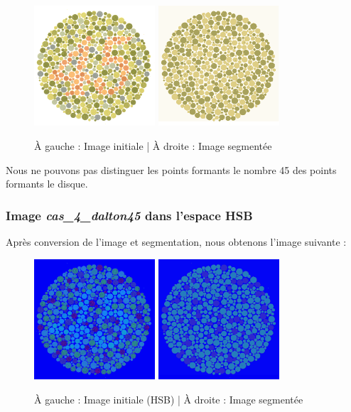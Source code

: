\documentclass[a4paper]{article}
\begin{document}
\begin{figure}[H]
\begin{center}
\includegraphics[width=170px]{../base/cas_4_dalton45.png}
\includegraphics[width=170px]{../resultats/cas_4_dalton45_seg.png}
\end{center}
\caption{À gauche : Image initiale | À droite : Image segmentée}
\end{figure}

Nous ne pouvons pas distinguer les points formants le nombre 45 des points formants le disque.

\subsubsection{Image {\em cas\_4\_dalton45} dans l'espace HSB}

Après conversion de l'image et segmentation, nous obtenons l'image suivante :

\begin{figure}[H]
\begin{center}
\includegraphics[width=170px]{../resultats/cas_4_dalton45_hsb.png}
\includegraphics[width=170px]{../resultats/cas_4_dalton45_hsb_seg.png}
\end{center}
\caption{À gauche : Image initiale (HSB) | À droite : Image segmentée}
\end{figure}
\end{document}
